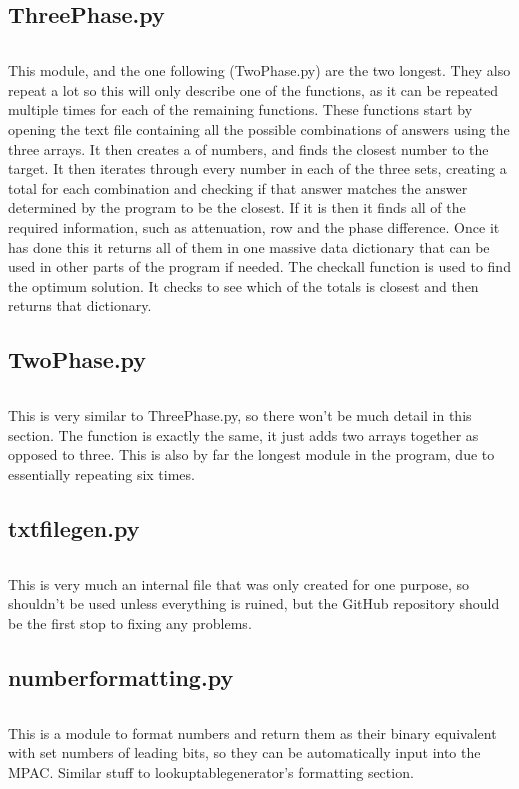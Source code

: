 \documentclass{article}
\begin{document}
\subsection{ThreePhase.py}
\inputminted[linenos, breaklines]{python}{../src/ThreePhase.py}
This module, and the one following (TwoPhase.py) are the two longest. They also repeat a lot so
this will only describe one of the functions, as it can be repeated multiple times for each of the
remaining functions. These functions start by opening the text file containing all the possible
combinations of answers using the three arrays. It then creates a of numbers, and finds the closest
number to the target. It then iterates through every number in each of the three sets, creating a
total for each combination and checking if that answer matches the answer determined by the program
to be the closest. If it is then it finds all of the required information, such as attenuation, row
and the phase difference. Once it has done this it returns all of them in one massive data
dictionary that can be used in other parts of the program if needed. The checkall function is used
to find the optimum solution. It checks to see which of the totals is closest and then returns that
dictionary.
\subsection{TwoPhase.py}
\inputminted[linenos, breaklines]{python}{../src/TwoPhase.py}
This is very similar to ThreePhase.py, so there won't be much detail in this section. The function
is exactly the same, it just adds two arrays together as opposed to three. This is also by far the
longest module in the program, due to essentially repeating six times.
\subsection{txtfilegen.py}
\inputminted[linenos,breaklines]{python}{../src/txtfilegen.py}
This is very much an internal file that was only created for one purpose, so shouldn't be used
unless everything is ruined, but the GitHub repository should be the first stop to fixing any
problems.
\subsection{numberformatting.py}
\inputminted[linenos, breaklines]{python}{../src/numberformatting.py}
This is a module to format numbers and return them as their binary equivalent with set numbers of
leading bits, so they can be automatically input into the MPAC. Similar stuff to
lookuptablegenerator's formatting section.
\end{document}
